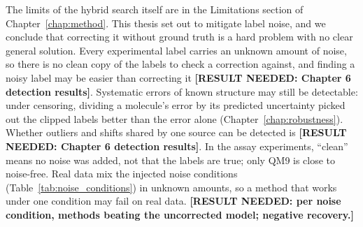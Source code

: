 The limits of the hybrid search itself are in the Limitations section of Chapter~\ref{chap:method}. This thesis set out to mitigate label noise, and we conclude that correcting it without ground truth is a hard problem with no clear general solution. Every experimental label carries an unknown amount of noise, so there is no clean copy of the labels to check a correction against, and finding a noisy label may be easier than correcting it \textbf{[RESULT NEEDED: Chapter 6 detection results]}. Systematic errors of known structure may still be detectable: under censoring, dividing a molecule's error by its predicted uncertainty picked out the clipped labels better than the error alone (Chapter~\ref{chap:robustness}). Whether outliers and shifts shared by one source can be detected is \textbf{[RESULT NEEDED: Chapter 6 detection results]}. In the assay experiments, ``clean'' means no noise was added, not that the labels are true; only QM9 is close to noise-free. Real data mix the injected noise conditions (Table~\ref{tab:noise_conditions}) in unknown amounts, so a method that works under one condition may fail on real data. \textbf{[RESULT NEEDED: per noise condition, methods beating the uncorrected model; negative recovery.]}

